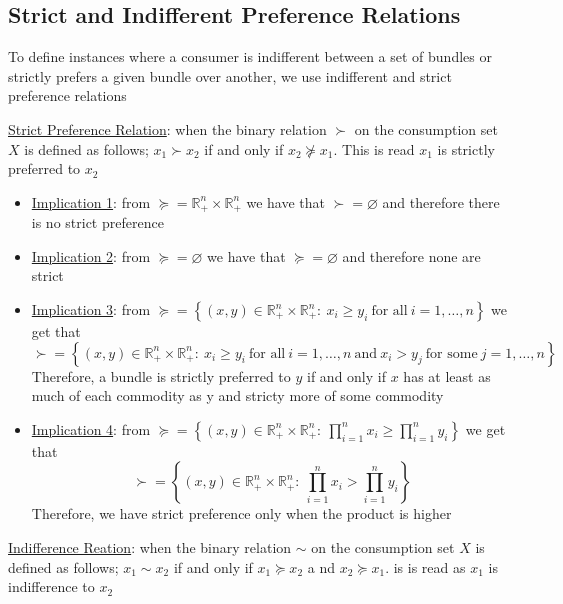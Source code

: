 \documentclass{article}
\begin{document}
\subsection{Strict and Indifferent Preference Relations}
To define instances where a consumer is indifferent between a set of bundles or strictly prefers a given bundle over another, we use indifferent and strict preference relations \par \vspace{0.3em}
  \underline{Strict Preference Relation}: when the binary relation $\succ$ on the consumption set $X$ is defined as follows; $x_{1} \succ x_{2}$ if and only if $x_{2} \nsucceq x_{1}$. This is read $x_{1}$ is strictly preferred to $x_{2}$
  \begin{itemize}
    \item  \underline{Implication 1}: from $\succeq = \mathbb{R}_{+}^{n} \times \mathbb{R}_{+}^{n}$ we have that $\succ = \varnothing$ and therefore there is no strict preference
    \item  \underline{Implication 2}: from $\succeq = \varnothing$ we have that $\succeq = \varnothing$ and therefore none are strict
    \item  \underline{Implication 3}: from $\succeq = \left\{ (x,y) \in \mathbb{R}_{+}^{n} \times \mathbb{R}_{+}^{n}: \ x_{i} \geq y_{i} \ \text{for all} \ i = 1, \dots, n \right\}$ we get that $$\succ = \left\{ (x,y) \in \mathbb{R}_{+}^{n} \times \mathbb{R}_{+}^{n}: \ x_{i} \geq y_{i} \ \text{for all} \ i = 1, \dots, n \ \text{and} \ x_{i}>y_{j} \ \text{for some} \ j = 1, \dots, n \right\}$$Therefore, a bundle is strictly preferred to $y$ if and only if $x$ has  at least as much of each commodity as y and stricty more of some commodity
    \item  \underline{Implication 4}: from $\succeq = \left\{ (x,y) \in \mathbb{R}_{+}^{n} \times \mathbb{R}_{+}^{n}: \ \prod_{i=1}^{n} x_{i} \geq \prod_{i=1}^{n} y_{i} \right\}$ we get that $$\succ = \left\{ (x,y) \in \mathbb{R}_{+}^{n} \times \mathbb{R}_{+}^{n}: \ \prod_{i=1}^{n} x_{i} > \prod_{i=1}^{n} y_{i} \right\}$$Therefore, we have strict preference only when the product is higher
  \end{itemize}
  \par
  \underline{Indifference Reation}: when the binary relation $\sim$ on the consumption set $X$ is defined as follows; $x_{1} \sim x_{2}$ if and only if $x_{1} \succeq x_{2}$ a nd $x_{2} \succeq x_{1}$. is is read as $x_{1}$ is indifference to $x_{2}$
\end{document}

